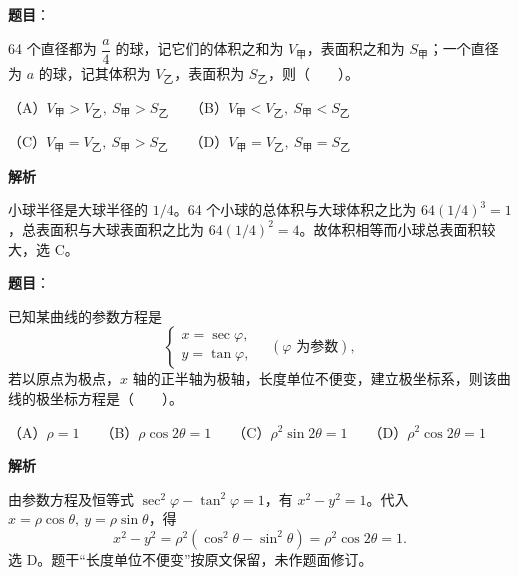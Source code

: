 \begin{answer}

\textbf{题目}：

64 个直径都为 \(\dfrac a4\) 的球，记它们的体积之和为 \(V_{\text{甲}}\)，表面积之和为 \(S_{\text{甲}}\)；一个直径为 \(a\) 的球，记其体积为 \(V_{\text{乙}}\)，表面积为 \(S_{\text{乙}}\)，则\mbox{（　　）}。

（A）\(V_{\text{甲}}>V_{\text{乙}},\ S_{\text{甲}}>S_{\text{乙}}\)　　（B）\(V_{\text{甲}}<V_{\text{乙}},\ S_{\text{甲}}<S_{\text{乙}}\)

（C）\(V_{\text{甲}}=V_{\text{乙}},\ S_{\text{甲}}>S_{\text{乙}}\)　　（D）\(V_{\text{甲}}=V_{\text{乙}},\ S_{\text{甲}}=S_{\text{乙}}\)

\textbf{解析}

小球半径是大球半径的 \(1/4\)。64 个小球的总体积与大球体积之比为 \(64(1/4)^3=1\)，总表面积与大球表面积之比为 \(64(1/4)^2=4\)。故体积相等而小球总表面积较大，选 C。


\end{answer}
\begin{answer}

\textbf{题目}：

已知某曲线的参数方程是
\nopagebreak[4]
\[
\begin{cases}
x=\sec\varphi,\\
y=\tan\varphi,
\end{cases}
\quad(\varphi\text{ 为参数}),
\]
若以原点为极点，\(x\) 轴的正半轴为极轴，长度单位不便变，建立极坐标系，则该曲线的极坐标方程是\mbox{（　　）}。

（A）\(\rho=1\)　　（B）\(\rho\cos2\theta=1\)　　（C）\(\rho^2\sin2\theta=1\)　　（D）\(\rho^2\cos2\theta=1\)

\textbf{解析}

由参数方程及恒等式 \(\sec^2\varphi-\tan^2\varphi=1\)，有 \(x^2-y^2=1\)。代入 \(x=\rho\cos\theta,\ y=\rho\sin\theta\)，得
\nopagebreak[4]
\[
x^2-y^2=\rho^2(\cos^2\theta-\sin^2\theta)=\rho^2\cos2\theta=1.
\]
选 D。题干“长度单位不便变”按原文保留，未作题面修订。


\end{answer}
